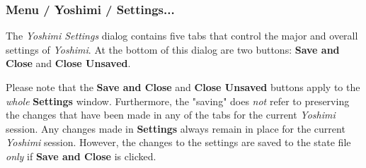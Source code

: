 \iffalse


\subsubsection{Menu / Yoshimi / New instance with id...}
\label{subsubsec:menu_yoshimi_new_instance_with_id}

   Creates a new instance of \textsl{Yoshimi}
   with an ID that is a number.
   See \figureref{fig:yoshimi_instance_dialog}.

\begin{figure}[H]
   \centering 
   \texttt{[image: menu/Yoshimi/yoshimi-instance-id.jpg]}
   \caption{Yoshimi Menu, Instance Dialog}
   \label{fig:yoshimi_instance_dialog}
\end{figure}

   Useful when connecting devices with JACK.
   Start a normal (JACK-using) instance of \textsl{Yoshimi}.
   Then use this menu entry, supply a number as an ID.
   \textsl{Yoshimi} will start another instance
   of itself, with an ID of whatever number one specified.
   This instance can be verified by running a JACK session manager such as
   \textsl{QJackCtl}.

\fi

\subsubsection{Menu / Yoshimi / Settings...}
\label{subsubsec:menu_yoshimi_settings}

   The \textsl{Yoshimi Settings} dialog contains five tabs that control the
   major and overall settings of \textsl{Yoshimi}.  At the bottom of this
   dialog are two buttons:
   \textbf{Save and Close} and \textbf{Close Unsaved}.

   Please note that the \textbf{Save and Close} and \textbf{Close Unsaved}
   buttons apply to the \textsl{whole}
   \textbf{Settings} window.
   Furthermore, the "saving" does \textsl{not} refer to preserving the changes
   that have been made
   in any of the tabs for the current \textsl{Yoshimi} session.  Any changes
   made in \textbf{Settings} always remain in place for the current
   \textsl{Yoshimi} session.
   However, the changes to the settings are saved to
   the state file \textsl{only} if \textbf{Save and Close} is clicked.

   \setcounter{ItemCounter}{0}      %

